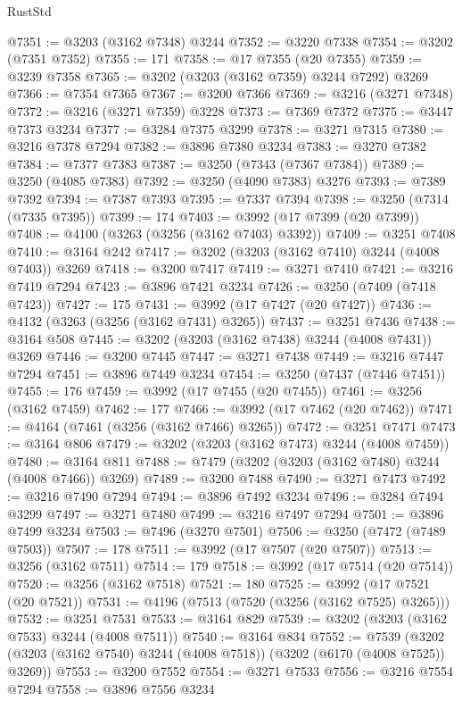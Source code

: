 \begin{lexlean}{RustStd}
\begin{coremodule}
@7351 := @3203 (@3162 @7348) @3244
@7352 := @3220 @7338
@7354 := @3202 (@7351 @7352)
@7355 := 171
@7358 := @17 @7355 (@20 @7355)
@7359 := @3239 @7358
@7365 := @3202 (@3203 (@3162 @7359) @3244 @7292) @3269
@7366 := @7354 @7365
@7367 := @3200 @7366
@7369 := @3216 (@3271 @7348)
@7372 := @3216 (@3271 @7359) @3228
@7373 := @7369 @7372
@7375 := @3447 @7373 @3234
@7377 := @3284 @7375 @3299
@7378 := @3271 @7315
@7380 := @3216 @7378 @7294
@7382 := @3896 @7380 @3234
@7383 := @3270 @7382
@7384 := @7377 @7383
@7387 := @3250 (@7343 (@7367 @7384))
@7389 := @3250 (@4085 @7383)
@7392 := @3250 (@4090 @7383) @3276
@7393 := @7389 @7392
@7394 := @7387 @7393
@7395 := @7337 @7394
@7398 := @3250 (@7314 (@7335 @7395))
@7399 := 174
@7403 := @3992 (@17 @7399 (@20 @7399))
@7408 := @4100 (@3263 (@3256 (@3162 @7403) @3392))
@7409 := @3251 @7408
@7410 := @3164 @242
@7417 := @3202 (@3203 (@3162 @7410) @3244 (@4008 @7403)) @3269
@7418 := @3200 @7417
@7419 := @3271 @7410
@7421 := @3216 @7419 @7294
@7423 := @3896 @7421 @3234
@7426 := @3250 (@7409 (@7418 @7423))
@7427 := 175
@7431 := @3992 (@17 @7427 (@20 @7427))
@7436 := @4132 (@3263 (@3256 (@3162 @7431) @3265))
@7437 := @3251 @7436
@7438 := @3164 @508
@7445 := @3202 (@3203 (@3162 @7438) @3244 (@4008 @7431)) @3269
@7446 := @3200 @7445
@7447 := @3271 @7438
@7449 := @3216 @7447 @7294
@7451 := @3896 @7449 @3234
@7454 := @3250 (@7437 (@7446 @7451))
@7455 := 176
@7459 := @3992 (@17 @7455 (@20 @7455))
@7461 := @3256 (@3162 @7459)
@7462 := 177
@7466 := @3992 (@17 @7462 (@20 @7462))
@7471 := @4164 (@7461 (@3256 (@3162 @7466) @3265))
@7472 := @3251 @7471
@7473 := @3164 @806
@7479 := @3202 (@3203 (@3162 @7473) @3244 (@4008 @7459))
@7480 := @3164 @811
@7488 := @7479 (@3202 (@3203 (@3162 @7480) @3244 (@4008 @7466)) @3269)
@7489 := @3200 @7488
@7490 := @3271 @7473
@7492 := @3216 @7490 @7294
@7494 := @3896 @7492 @3234
@7496 := @3284 @7494 @3299
@7497 := @3271 @7480
@7499 := @3216 @7497 @7294
@7501 := @3896 @7499 @3234
@7503 := @7496 (@3270 @7501)
@7506 := @3250 (@7472 (@7489 @7503))
@7507 := 178
@7511 := @3992 (@17 @7507 (@20 @7507))
@7513 := @3256 (@3162 @7511)
@7514 := 179
@7518 := @3992 (@17 @7514 (@20 @7514))
@7520 := @3256 (@3162 @7518)
@7521 := 180
@7525 := @3992 (@17 @7521 (@20 @7521))
@7531 := @4196 (@7513 (@7520 (@3256 (@3162 @7525) @3265)))
@7532 := @3251 @7531
@7533 := @3164 @829
@7539 := @3202 (@3203 (@3162 @7533) @3244 (@4008 @7511))
@7540 := @3164 @834
@7552 := @7539 (@3202 (@3203 (@3162 @7540) @3244 (@4008 @7518)) (@3202 (@6170 (@4008 @7525)) @3269))
@7553 := @3200 @7552
@7554 := @3271 @7533
@7556 := @3216 @7554 @7294
@7558 := @3896 @7556 @3234

\end{coremodule}
\end{lexlean}
